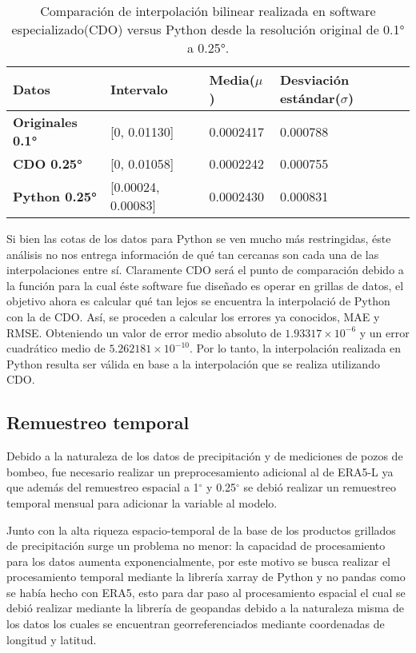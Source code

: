     \begin{table}[H] 
        \caption[Comparación de interpolaciones Python/CDO]{Comparación de interpolación bilinear realizada en software especializado(CDO) versus Python desde la resolución original de 0.1° a 0.25°.}
        \begin{tabularx}{0.9\textwidth }{CCCC}
        \toprule
         \textbf{Datos}& \textbf{Intervalo}	&\textbf{Media($\mu$)}  &\textbf{Desviación estándar($\sigma$)}\\
            \midrule
            \textbf{Originales 0.1°}	&	[0, 0.01130]       &  0.0002417  & 0.000788\\
            \textbf{CDO 0.25°}	        &   [0, 0.01058]       &  0.0002242  & 0.000755\\
            \textbf{Python 0.25°}       &   [0.00024, 0.00083] &  0.0002430  & 0.000831\\
            \bottomrule
        \end{tabularx}
    \end{table}

    Si bien las cotas de los datos para Python se ven mucho más restringidas, éste análisis no nos entrega información de qué tan cercanas son cada una de las interpolaciones entre sí. Claramente CDO será el punto de comparación debido a 
    la función para la cual éste software fue diseñado es operar en grillas de datos, el objetivo ahora es calcular qué tan lejos se encuentra la interpolació de Python con la de CDO.
    Así, se proceden a calcular los errores ya conocidos, MAE y RMSE. Obteniendo un valor de error medio absoluto de $1.93317\times 10^{-6}$ y un error cuadrático medio de $5.262181\times 10^{-10}$. Por lo tanto, 
    la interpolación realizada en Python resulta ser válida en base a la interpolación que se realiza utilizando CDO.


    \subsection{Remuestreo temporal}
    Debido a la naturaleza de los datos de precipitación y de mediciones de pozos de bombeo, fue necesario realizar un preprocesamiento 
    adicional al de ERA5-L ya que además del remuestreo espacial a 1$^\circ$ y 0.25$^\circ$ se debió realizar un remuestreo temporal
    mensual para adicionar la variable al modelo.

    Junto con la alta riqueza espacio-temporal de la base de los productos grillados de precipitación surge un problema no menor: la capacidad de procesamiento para los datos aumenta
    exponencialmente, por este motivo se busca realizar el procesamiento temporal mediante la librería xarray de Python y no pandas como se había hecho con
    ERA5, esto para dar paso al procesamiento espacial el cual se debió realizar mediante la librería de geopandas debido a la naturaleza misma de los datos
    los cuales se encuentran georreferenciados mediante coordenadas de longitud y latitud.

